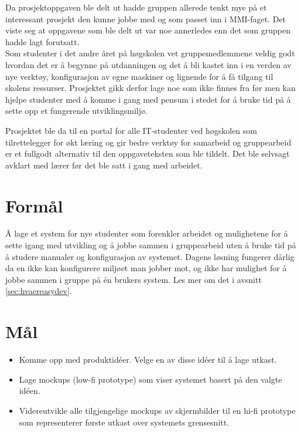 Da prosjektoppgaven ble delt ut hadde gruppen allerede tenkt mye på et interessant prosjekt den kunne jobbe med og som passet inn i MMI-faget. Det viste seg at oppgavene som ble delt ut var noe annerledes enn det som gruppen hadde lagt forutsatt.\\

Som studenter i det andre året på høgskolen vet gruppemedlemmene veldig godt hvordan det er å begynne på utdanningen og det å bli kastet inn i en verden av nye verktøy, konfigurasjon av egne maskiner og lignende for å få tilgang til skolens ressurser. Prosjektet gikk derfor lage noe som ikke finnes fra før men kan hjelpe studenter med å komme i gang med pensum i stedet for å bruke tid på å sette opp et fungerende utviklingsmiljø.

Prosjektet ble da til en portal for alle IT-studenter ved høgskolen som tilrettelegger for økt læring og gir bedre verktøy for samarbeid og gruppearbeid er et fullgodt alternativ til den oppgaveteksten som ble tildelt. Det ble selvsagt avklart med lærer før det ble satt i gang med arbeidet. 

\section{Formål}
Å lage et system for nye studenter som forenkler arbeidet og mulighetene for å sette igang med utvikling og å jobbe sammen i gruppearbeid uten å bruke tid på å studere manualer og konfigurasjon av systemet. Dagens løsning fungerer dårlig da en ikke kan konfigurere miljøet man jobber mot, og ikke har mulighet for å jobbe sammen i gruppe på én brukers system. Les mer om det i avsnitt \ref{sec:hvaereasydev}.

\section{Mål}
\begin{itemize}
\setlength{\itemsep}{1pt}
\setlength{\parskip}{0pt}
\setlength{\parsep}{0pt}
\item Komme opp med produktidéer. Velge en av disse idéer til å lage utkast.
\item Lage mockups (low-fi prototype) som viser systemet basert på den valgte idéen.
\item Videreutvikle alle tilgjengelige mockups av skjermbilder til en hi-fi prototype som representerer første utkast over systemets grensesnitt.
\end{itemize}

